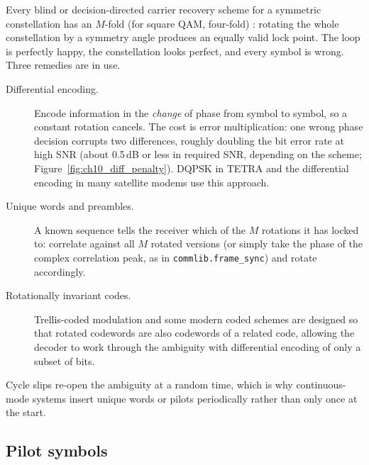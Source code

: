 Every blind or decision-directed carrier recovery scheme for a symmetric constellation has an
$M$-fold (for square QAM, four-fold) : rotating the whole constellation by a
symmetry angle produces an equally valid lock point. The loop is perfectly happy, the constellation
looks perfect, and every symbol is wrong. Three remedies are in use.
\begin{description}
\item[Differential encoding.] Encode information in the \emph{change} of phase from symbol to
symbol, so a constant rotation cancels. The cost is error multiplication: one wrong phase decision
corrupts two differences, roughly doubling the bit error rate at high SNR (about 0.5\,dB or less in
required SNR, depending on the scheme; Figure~\ref{fig:ch10_diff_penalty}). DQPSK in TETRA and the
differential encoding in many satellite modems use this approach.
\item[Unique words and preambles.] A known sequence tells the receiver which of the $M$ rotations it
has locked to: correlate against all $M$ rotated versions (or simply take the phase of the complex
correlation peak, as in \texttt{commlib.frame\_sync}) and rotate accordingly.
\item[Rotationally invariant codes.] Trellis-coded modulation and some modern coded schemes are
designed so that rotated codewords are also codewords of a related code, allowing the decoder to
work through the ambiguity with differential encoding of only a subset of bits.
\end{description}
Cycle slips re-open the ambiguity at a random time, which is why continuous-mode systems insert unique
words or pilots periodically rather than only once at the start.


\subsection{Pilot symbols}

